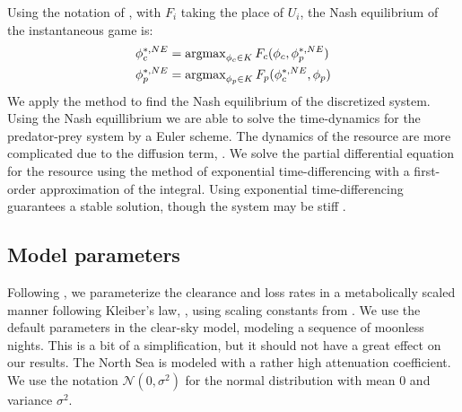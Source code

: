 Using the notation of , with $F_i$ taking the place of $U_i$, the Nash equilibrium of the instantaneous game is:
\begin{equation}
  \label{eq:nash_equilibria}
  \begin{split}
  	\phi_c^{*,NE} &=  \argmax_{\phi_c \in K}  F_c(\phi_c, \phi_p^{*,NE}) \\
  	\phi_p^{*,NE} &=  \argmax_{\phi_p \in K} F_p(\phi_c^{*,NE}, \phi_p)
  \end{split}
\end{equation}
We apply the method  to find the Nash equilibrium of the discretized system. Using the Nash equillibrium  we are able to solve the time-dynamics for the predator-prey system  by a Euler scheme. The dynamics of the resource are more complicated due to the diffusion term, . We solve the partial differential equation for the resource using the method of exponential time-differencing \citep{hochbruck2010exponential} with a first-order approximation of the integral. Using exponential time-differencing guarantees a stable solution, though the system may be stiff \cite{hochbruck2010exponential}.

\subsection{Model parameters}
Following \citep{yodzis1992body}, we parameterize the clearance and loss rates in a metabolically scaled manner following Kleiber's law, \citep{yodzis1992body}, using scaling constants from \citep{kha_2019}. We use the default parameters in the clear-sky model, modeling a sequence of moonless nights. This is a bit of a simplification, but it should not have a great effect on our results. The North Sea is modeled with a rather high attenuation coefficient. We use the notation $\mathcal{N}(0,\sigma^2)$ for the normal distribution with mean $0$ and variance $\sigma^2$.


